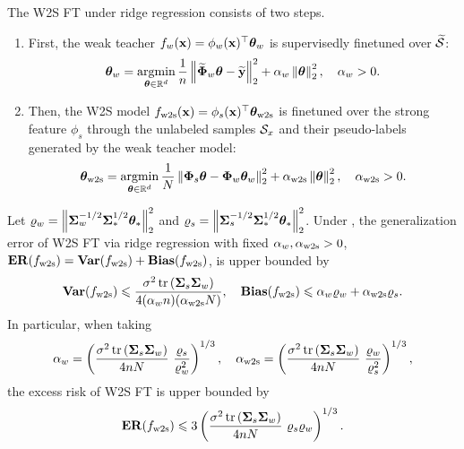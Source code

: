 The W2S FT under ridge regression consists of two steps.
\begin{enumerate}[label=(\alph*)]
    \item First, the weak teacher $f_w(\mathbf{x}) = \phi_w(\mathbf{x})^\top \boldsymbol{\theta}_w$ is supervisedly finetuned over $\widetilde{{\mathcal{S}}}$: 
    \begin{align}\label{eq:w2s_weak_ridge}
        \boldsymbol{\theta}_w = \mathop{\mathrm{argmin}}_{\boldsymbol{\theta} \in \mathbb{R}^d} \frac{1}{n}\left\|\widetilde{\boldsymbol{\Phi}}_w \boldsymbol{\theta} - \widetilde{\mathbf{y}}\right\|_2^2 + \alpha_w \left\|\boldsymbol{\theta}\right\|_2^2, \quad \alpha_w > 0.
    \end{align}
    \item Then, the W2S model $f_{\mathrm{w2s}}(\mathbf{x}) = \phi_s(\mathbf{x})^\top \boldsymbol{\theta}_{\mathrm{w2s}}$ is finetuned over the strong feature $\phi_s$ through the unlabeled samples ${\mathcal{S}}_x$ and their pseudo-labels generated by the weak teacher model:
    \begin{align}\label{eq:w2s_strong_ridge}
        \boldsymbol{\theta}_{\mathrm{w2s}} = \mathop{\mathrm{argmin}}_{\boldsymbol{\theta} \in \mathbb{R}^d} \frac{1}{N}\left\|\boldsymbol{\Phi}_s \boldsymbol{\theta} - \boldsymbol{\Phi}_w \boldsymbol{\theta}_w\right\|_2^2 + \alpha_{\mathrm{w2s}} \left\|\boldsymbol{\theta}\right\|_2^2, \quad \alpha_{\mathrm{w2s}} > 0.
    \end{align}
\end{enumerate}

\begin{theorem}\label{thm:w2s_ridge}
    Let $\varrho_w = \left\|\boldsymbol{\Sigma}_w^{-1/2} \boldsymbol{\Sigma}_*^{1/2} \boldsymbol{\theta}_*\right\|_2^2$ and $\varrho_s = \left\|\boldsymbol{\Sigma}_s^{-1/2} \boldsymbol{\Sigma}_*^{1/2} \boldsymbol{\theta}_*\right\|_2^2$.
    Under , the generalization error of W2S FT via ridge regression with fixed $\alpha_w, \alpha_{\mathrm{w2s}} > 0$, $\mathbf{ER}(f_{\mathrm{w2s}}) = \mathbf{Var}(f_{\mathrm{w2s}}) + \mathbf{Bias}(f_{\mathrm{w2s}})$, is upper bounded by
    \begin{align*}
        \mathbf{Var}(f_{\mathrm{w2s}}) \leqslant \frac{\sigma^2 \mathop{\mathrm{tr}}\left(\boldsymbol{\Sigma}_s \boldsymbol{\Sigma}_w\right)}{4 (\alpha_w n) (\alpha_{\mathrm{w2s}} N)}, \quad
        \mathbf{Bias}(f_{\mathrm{w2s}}) \leqslant \alpha_w \varrho_w + \alpha_{\mathrm{w2s}} \varrho_s.
    \end{align*}
    In particular, when taking  
    \begin{align*}
        \alpha_w = \left(\frac{\sigma^2 \mathop{\mathrm{tr}}\left(\boldsymbol{\Sigma}_s \boldsymbol{\Sigma}_w\right)}{4 n N}\ \frac{\varrho_s}{\varrho_w^2}\right)^{1/3}, \quad 
        \alpha_{\mathrm{w2s}} = \left(\frac{\sigma^2 \mathop{\mathrm{tr}}\left(\boldsymbol{\Sigma}_s \boldsymbol{\Sigma}_w\right)}{4 n N}\ \frac{\varrho_w}{\varrho_s^2}\right)^{1/3},
    \end{align*}
    the excess risk of W2S FT is upper bounded by
    \begin{align*}
        \mathbf{ER}(f_{\mathrm{w2s}}) \leqslant 3 \left(\frac{\sigma^2 \mathop{\mathrm{tr}}\left(\boldsymbol{\Sigma}_s \boldsymbol{\Sigma}_w\right)}{4 n N}\ \varrho_s \varrho_w\right)^{1/3}.
    \end{align*}
\end{theorem}

